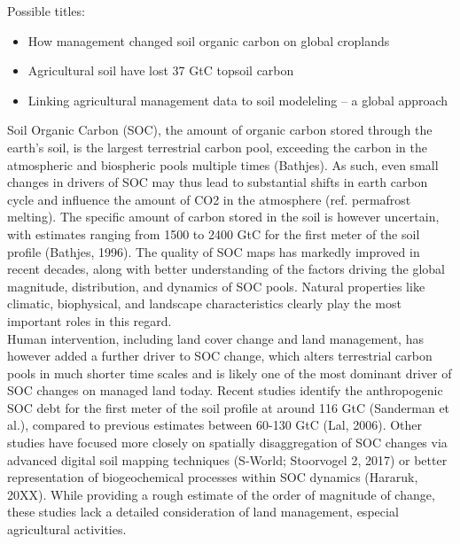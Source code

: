 \documentclass[gc, manuscript]{copernicus}
\begin{document}


\newpage

\introduction

Possible titles:

\begin{itemize}
\item
  How management changed soil organic carbon on global croplands
\item
  Agricultural soil have lost 37 GtC topsoil carbon
\item
  Linking agricultural management data to soil modeleling -- a global approach
\end{itemize}

Soil Organic Carbon (SOC), the amount of organic carbon stored through the earth's soil, is the largest terrestrial carbon pool, exceeding the carbon in the atmospheric and biospheric pools multiple times (Bathjes). As such, even small changes in drivers of SOC may thus lead to substantial shifts in earth carbon cycle and influence the amount of CO2 in the atmosphere (ref. permafrost melting). The specific amount of carbon stored in the soil is however uncertain, with estimates ranging from 1500 to 2400 GtC for the first meter of the soil profile (Bathjes, 1996). The quality of SOC maps has markedly improved in recent decades, along with better understanding of the factors driving the global magnitude, distribution, and dynamics of SOC pools. Natural properties like climatic, biophysical, and landscape characteristics clearly play the most important roles in this regard.\\
Human intervention, including land cover change and land management, has however added a further driver to SOC change, which alters terrestrial carbon pools in much shorter time scales and is likely one of the most dominant driver of SOC changes on managed land today. Recent studies identify the anthropogenic SOC debt for the first meter of the soil profile at around 116 GtC (Sanderman et al.), compared to previous estimates between 60-130 GtC (Lal, 2006). Other studies have focused more closely on spatially disaggregation of SOC changes via advanced digital soil mapping techniques (S-World; Stoorvogel 2, 2017) or better representation of biogeochemical processes within SOC dynamics (Hararuk, 20XX). While providing a rough estimate of the order of magnitude of change, these studies lack a detailed consideration of land management, especial agricultural activities.\\
\end{document}
